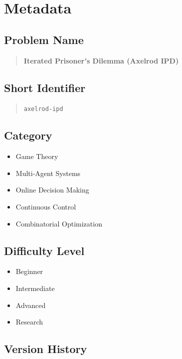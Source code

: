 ﻿\documentclass[11pt,a4paper]{article}
\begin{document}

\section{Metadata}

\subsection{Problem Name}
\begin{quote}
\textbf{Iterated Prisoner's Dilemma (Axelrod IPD)}
\end{quote}

\subsection{Short Identifier}
\begin{quote}
\texttt{axelrod-ipd}
\end{quote}

\subsection{Category}
\begin{itemize}
    \item[$\blacksquare$] Game Theory
    \item[$\blacksquare$] Multi-Agent Systems
    \item[$\blacksquare$] Online Decision Making
    \item[$\square$] Continuous Control
    \item[$\square$] Combinatorial Optimization
\end{itemize}

\subsection{Difficulty Level}
\begin{itemize}
    \item[$\square$] Beginner
    \item[$\blacksquare$] Intermediate
    \item[$\square$] Advanced
    \item[$\square$] Research
\end{itemize}

\subsection{Version History}
\end{document}
